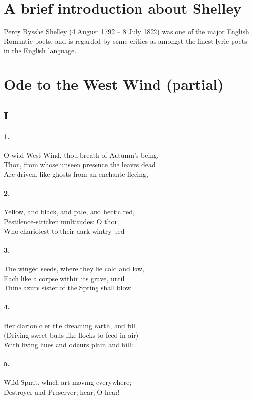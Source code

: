 \documentclass{doc}
\begin{document}
	\section{A brief introduction about Shelley}
		Percy Bysshe Shelley (4 August 1792 -- 8 July 1822) was one of the major English Romantic poets, and is regarded by some critics as amongst the finest lyric poets in the English language. 
	\section{Ode to the West Wind (partial)}
		\subsection{I}
			\paragraph{1.}
				O wild West Wind, thou breath of Autumn’s being, \\ 
				Thou, from whose unseen presence the leaves dead \\ 
				Are driven, like ghosts from an enchante fleeing,
			\paragraph{2.}
				Yellow, and black, and pale, and hectic red,\\ 
				Pestilence-stricken multitudes: O thou, \\	
				Who chariotest to their dark wintry bed
			\paragraph{3.}
				The wingèd seeds, where they lie cold and low,\\	
				Each like a corpse within its grave, until \\
				Thine azure sister of the Spring shall blow
			\paragraph{4.}
				Her clarion o’er the dreaming earth, and fill \\ (Driving sweet buds like flocks to feed in air) \\ With living hues and odours plain and hill:
			\paragraph{5.}
				Wild Spirit, which art moving everywhere; \\ Destroyer and Preserver; hear, O hear!
\end{document}
